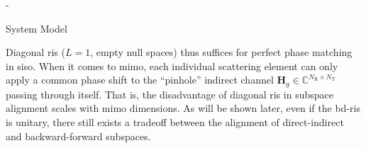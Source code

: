 \begin{section}{-}
\begin{subsection}{System Model}
\begin{itemize}
			Diagonal \gls{ris} ($L=1$, empty null spaces) thus suffices for perfect phase matching in \gls{siso}.
			When it comes to \gls{mimo}, each individual scattering element can only apply a common phase shift to the ``pinhole'' indirect channel $\mathbf{H}_g \in \mathbb{C}^{N_\mathrm{R} \times N_\mathrm{T}}$ passing through itself.
			That is, the disadvantage of diagonal \gls{ris} in subspace alignment scales with \gls{mimo} dimensions.
			As will be shown later, even if the \gls{bd}-\gls{ris} is unitary, there still exists a tradeoff between the alignment of direct-indirect and backward-forward subspaces.
		\end{itemize}









\end{subsection}
\end{section}

